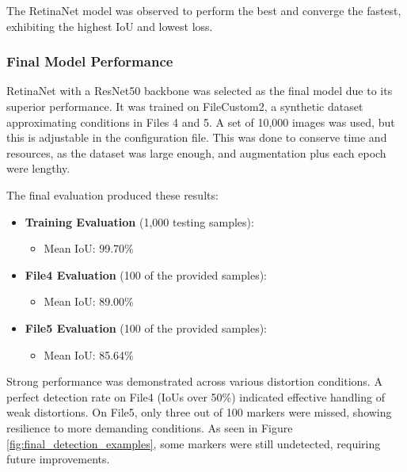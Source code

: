 \documentclass[conference]{IEEEtran}
\begin{document}
The RetinaNet model was observed to perform the best and converge the fastest, exhibiting the highest IoU and lowest loss.

\subsubsection{Final Model Performance}

RetinaNet with a ResNet50 backbone was selected as the final model due to its superior performance. It was trained on FileCustom2, a 
synthetic dataset approximating conditions in Files 4 and 5. A set of 10,000 images was used, but this is adjustable in the configuration 
file. This was done to conserve time and resources, as the dataset was large enough, and augmentation plus each epoch were lengthy.

The final evaluation produced these results:

\begin{itemize}
    \item \textbf{Training Evaluation} (1,000 testing samples):
        \begin{itemize}
            \item Mean IoU: 99.70\%
        \end{itemize}
    \item \textbf{File4 Evaluation} (100 of the provided samples):
        \begin{itemize}
            \item Mean IoU: 89.00\%
        \end{itemize}
    \item \textbf{File5 Evaluation} (100 of the provided samples):
        \begin{itemize}
            \item Mean IoU: 85.64\%
        \end{itemize}
\end{itemize}

Strong performance was demonstrated across various distortion conditions. A perfect detection rate on File4 (IoUs over 50\%) indicated 
effective handling of weak distortions. On File5, only three out of 100 markers were missed, showing resilience to more demanding conditions. 
As seen in Figure \ref{fig:final_detection_examples}, some markers were still undetected, requiring future improvements.
\end{document}
